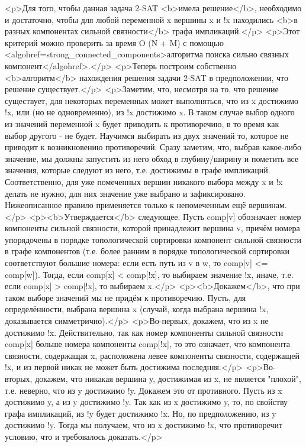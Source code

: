 <p>Для того, чтобы данная задача 2-SAT <b>имела решение</b>, необходимо и достаточно, чтобы для любой переменной x вершины x и !x находились <b>в разных компонентах сильной связности</b> графа импликаций.</p>
<p>Этот критерий можно проверить за время O (N + M) с помощью <algohref=strong_connected_components>алгоритма поиска сильно связных компонент</algohref>.</p>
<p>Теперь построим собственно <b>алгоритм</b> нахождения решения задачи 2-SAT в предположении, что решение существует.</p>
<p>Заметим, что, несмотря на то, что решение существует, для некоторых переменных может выполняться, что из x достижимо !x, или (но не одновременно), из !x достижимо x. В таком случае выбор одного из значений переменной x будет приводить к противоречию, в то время как выбор другого - не будет. Научимся выбирать из двух значений то, которое не приводит к возникновению противоречий. Сразу заметим, что, выбрав какое-либо значение, мы должны запустить из него обход в глубину/ширину и пометить все значения, которые следуют из него, т.е. достижимы в графе импликаций. Соответственно, для уже помеченных вершин никакого выбора между x и !x делать не нужно, для них значение уже выбрано и зафиксировано. Нижеописанное правило применяется только к непомеченным ещё вершинам.</p>
<p><b>Утверждается</b> следующее. Пусть comp[v] обозначает номер компоненты сильной связности, которой принадлежит вершина v, причём номера упорядочены в порядке топологической сортировки компонент сильной связности в графе компонентов (т.е. более ранним в порядке топологической сортировки соответствуют большие номера: если есть путь из v в w, то comp[v] <= comp[w]). Тогда, если comp[x] < comp[!x], то выбираем значение !x, иначе, т.е. если comp[x] > comp[!x], то выбираем x.</p>
<p><b>Докажем</b>, что при таком выборе значений мы не придём к противоречию. Пусть, для определённости, выбрана вершина x (случай, когда выбрана вершина !x, доказывается симметрично).</p>
<p>Во-первых, докажем, что из x не достижимо !x. Действительно, так как номер компоненты сильной связности comp[x] больше номера компоненты comp[!x], то это означает, что компонента связности, содержащая x, расположена левее компоненты связности, содержащей !x, и из первой никак не может быть достижима последняя.</p>
<p>Во-вторых, докажем, что никакая вершина y, достижимая из x, не является "плохой", т.е. неверно, что из y достижимо !y. Докажем это от противного. Пусть из x достижимо y, а из y достижимо !y. Так как из x достижимо y, то, по свойству графа импликаций, из !y будет достижимо !x. Но, по предположению, из y достижимо !y. Тогда мы получаем, что из x достижимо !x, что противоречит условию, что и требовалось доказать.</p>
